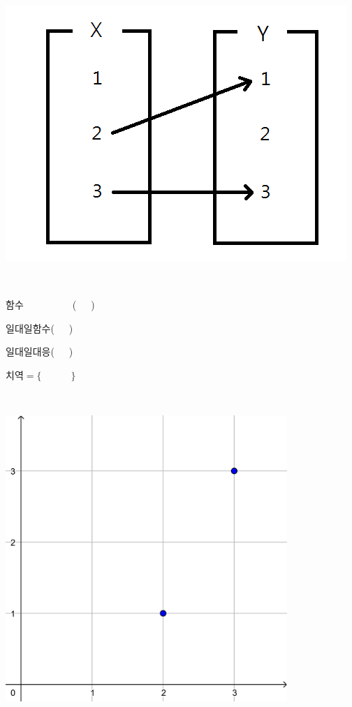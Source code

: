 \documentclass[a4paper]{oblivoir}
\begin{document}
%
\begin{minipage}{0.4\textwidth}
\includegraphics[width=\textwidth]{relation_2}
\end{minipage}
~
\begin{minipage}{0.20\textwidth}
함수~~~~~~~~~~(~~~)\par\bigskip
일대일함수(~~~)\par\bigskip
일대일대응(~~~)\par\bigskip
치역\(=\{\qquad\quad\}\)
\end{minipage}
~
\begin{minipage}{0.35\textwidth}
\includegraphics[width=0.8\textwidth]{relation_2-}
\end{minipage}
\end{document}
